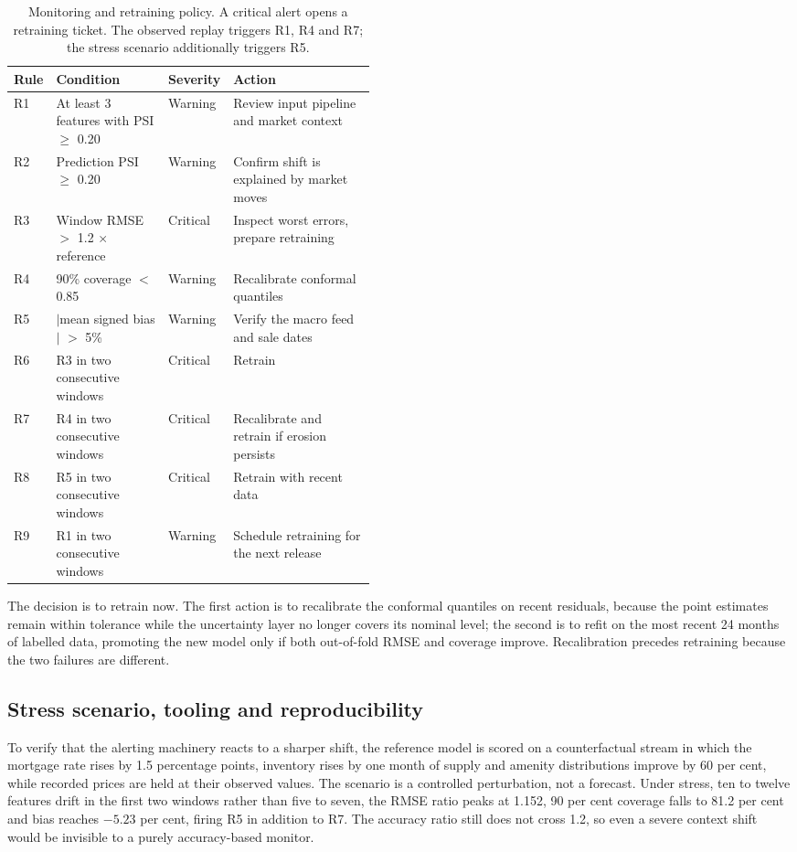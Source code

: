 \begin{table}[htbp]
\centering
\caption{Monitoring and retraining policy. A critical alert opens a retraining
ticket. The observed replay triggers R1, R4 and R7; the stress scenario additionally
triggers R5.}
\label{tab:rules}
\small
\begin{tabularx}{\linewidth}{@{}L{0.05\linewidth}L{0.31\linewidth}L{0.10\linewidth}X@{}}
\toprule
\textbf{Rule} & \textbf{Condition} & \textbf{Severity} & \textbf{Action} \\
\midrule
R1 & At least 3 features with PSI $\geq$ 0.20 & Warning & Review input pipeline and market context \\
R2 & Prediction PSI $\geq$ 0.20 & Warning & Confirm shift is explained by market moves \\
R3 & Window RMSE $>$ 1.2 $\times$ reference & Critical & Inspect worst errors, prepare retraining \\
R4 & 90\% coverage $<$ 0.85 & Warning & Recalibrate conformal quantiles \\
R5 & $|$mean signed bias$|$ $>$ 5\% & Warning & Verify the macro feed and sale dates \\
R6 & R3 in two consecutive windows & Critical & Retrain \\
R7 & R4 in two consecutive windows & Critical & Recalibrate and retrain if erosion persists \\
R8 & R5 in two consecutive windows & Critical & Retrain with recent data \\
R9 & R1 in two consecutive windows & Warning & Schedule retraining for the next release \\
\bottomrule
\end{tabularx}
\end{table}

The decision is to retrain now. The first action is to recalibrate the conformal
quantiles on recent residuals, because the point estimates remain within tolerance
while the uncertainty layer no longer covers its nominal level; the second is to refit
on the most recent 24 months of labelled data, promoting the new model only if both
out-of-fold RMSE and coverage improve. Recalibration precedes retraining because the
two failures are different.

\subsection{Stress scenario, tooling and reproducibility}

To verify that the alerting machinery reacts to a sharper shift, the reference model
is scored on a counterfactual stream in which the mortgage rate rises by 1.5
percentage points, inventory rises by one month of supply and amenity distributions
improve by 60 per cent, while recorded prices are held at their observed values. The
scenario is a controlled perturbation, not a forecast. Under stress, ten to twelve
features drift in the first two windows rather than five to seven, the RMSE ratio
peaks at 1.152, 90 per cent coverage falls to 81.2 per cent and bias reaches $-5.23$
per cent, firing R5 in addition to R7. The accuracy ratio still does not cross 1.2,
so even a severe context shift would be invisible to a purely accuracy-based
monitor.

